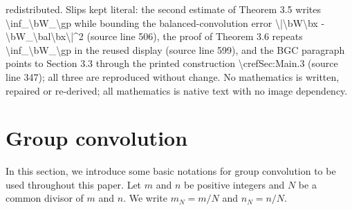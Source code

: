 \documentclass[10pt,a4paper]{amsart}
\numberwithin{equation}{section}
\theoremstyle{remark}
\begin{document}
redistributed. Slips kept literal: the second estimate of Theorem 3.5 writes \textbackslash{}inf\_{\textbackslash{}bW\_{\textbackslash{}gp}} while bounding the balanced-convolution error \textbackslash{}|\textbackslash{}bW\textbackslash{}bx - \textbackslash{}bW\_{\textbackslash{}bal}\textbackslash{}bx\textbackslash{}|\textasciicircum{}2 (source line 506), the proof of Theorem 3.6 repeats \textbackslash{}inf\_{\textbackslash{}bW\_{\textbackslash{}gp}} in the reused display (source line 599), and the BGC paragraph points to Section 3.3 through the printed construction \textbackslash{}cref{Sec:Main}.3 (source line 347); all three are reproduced without change. No mathematics is written, repaired or re-derived; all mathematics is native text with no image dependency.
\section{Group convolution}
\label{Sec:GC}
In this section, we introduce some basic notations for group convolution to be used throughout this paper.
Let $m$ and $n$ be positive integers and $N$ be a common divisor of $m$ and $n$.
We write $m_N = m/N$ and $n_N = n/N$.
\end{document}
